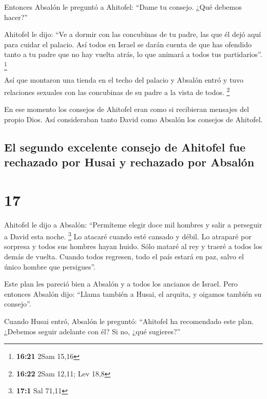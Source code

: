  Entonces Absalón le preguntó a Ahitofel: ``Dame tu
consejo. ¿Qué debemos hacer?''

 Ahitofel le dijo: ``Ve a dormir con las concubinas de tu
padre, las que él dejó aquí para cuidar el palacio. Así todos en Israel
se darán cuenta de que has ofendido tanto a tu padre que no hay vuelta
atrás, lo que animará a todos tus partidarios''. \footnote{\textbf{16:21}
  2Sam 15,16}

 Así que montaron una tienda en el techo del palacio y
Absalón entró y tuvo relaciones sexuales con las concubinas de su padre
a la vista de todos. \footnote{\textbf{16:22} 2Sam 12,11; Lev 18,8}

 En ese momento los consejos de Ahitofel eran como si
recibieran mensajes del propio Dios. Así consideraban tanto David como
Absalón los consejos de Ahitofel.

\hypertarget{el-segundo-excelente-consejo-de-ahitofel-fue-rechazado-por-husai-y-rechazado-por-absaluxf3n}{%
\subsection{El segundo excelente consejo de Ahitofel fue rechazado por
Husai y rechazado por
Absalón}\label{el-segundo-excelente-consejo-de-ahitofel-fue-rechazado-por-husai-y-rechazado-por-absaluxf3n}}

\hypertarget{section-16}{%
\section{17}\label{section-16}}

 Ahitofel le dijo a Absalón: ``Permíteme elegir doce mil
hombres y salir a perseguir a David esta noche. \footnote{\textbf{17:1}
  Sal 71,11}  Lo atacaré cuando esté cansado y débil. Lo
atraparé por sorpresa y todos sus hombres hayan huido. Sólo mataré al
rey  y traeré a todos los demás de vuelta. Cuando todos
regresen, todo el país estará en paz, salvo el único hombre que
persigues''.

 Este plan les pareció bien a Absalón y a todos los
ancianos de Israel.  Pero entonces Absalón dijo: ``Llama
también a Husai, el arquita, y oigamos también su consejo''.

 Cuando Husai entró, Absalón le preguntó: ``Ahitofel ha
recomendado este plan. ¿Debemos seguir adelante con él? Si no, ¿qué
sugieres?''

